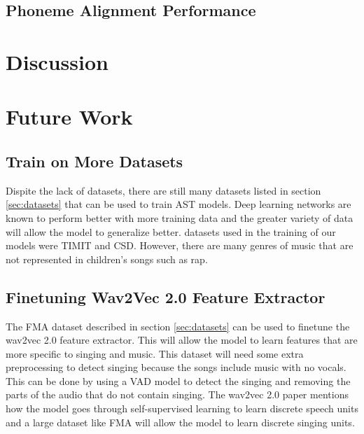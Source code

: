 \documentclass[letterpaper, 12pt]{article}
\begin{document}
\begin{multicols*}{2}
\subsection{Phoneme Alignment Performance}


\section{Discussion}

\section{Future Work}
\subsection{Train on More Datasets}
Dispite the lack of datasets, there are still many datasets listed in section \ref{sec:datasets}
that can be used to train AST models. Deep learning networks are known to perform better with more
training data and the greater variety of data will allow the model to generalize better.
datasets used in the training of our models were TIMIT and CSD. However, there are many genres of
music that are not represented in children's songs such as rap.

\subsection{Finetuning Wav2Vec 2.0 Feature Extractor}
The FMA dataset described in section \ref{sec:datasets} can be used to finetune the wav2vec 2.0
feature extractor. This will allow the model to learn features that are more specific to singing
and music. This dataset will need some extra preprocessing to detect singing because the songs
include music with no vocals. This can be done by using a VAD model to detect the singing and
removing the parts of the audio that do not contain singing. The wav2vec 2.0 paper mentions how
the model goes through self-supervised learning to learn discrete speech units \citep{wav2vec} and
a large dataset like FMA will allow the model to learn discrete singing units.


\end{multicols*}
\end{document}

